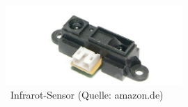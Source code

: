\begin{figure}[!h]  %
	\centering\includegraphics[width=0.6\textwidth]{images/infrarot.png}
	\caption{ \ Infrarot-Sensor  (Quelle: amazon.de)}
	\label{infrarot} %
\end{figure}
\pagebreak
